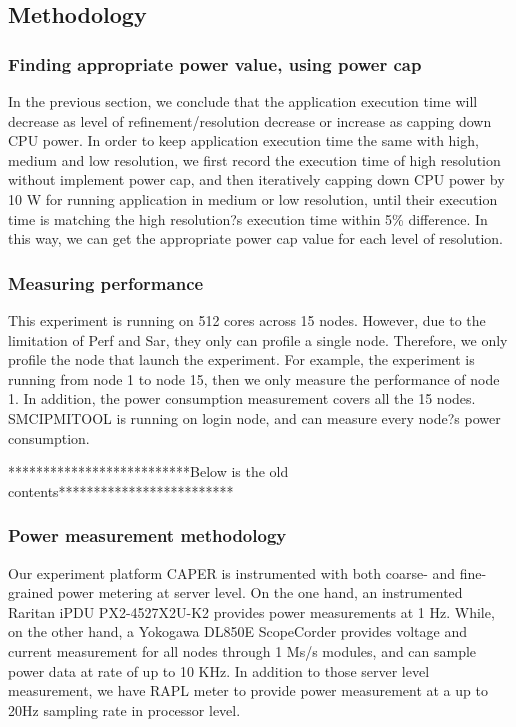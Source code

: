 \subsection{Methodology}
\subsubsection{Finding appropriate power value, using power cap}
In the previous section, we conclude that the application execution time will decrease as level of refinement/resolution decrease or increase as capping down CPU power. In order to keep application execution time the same with high, medium and low resolution, we first record the execution time of high resolution without implement power cap, and then iteratively capping down CPU power by 10 W for running application in medium or low resolution, until their execution time is matching the high resolution?s execution time within 5\% difference. In this way, we can get the appropriate power cap value for each level of resolution.

\subsubsection{Measuring performance}
This experiment is running on 512 cores across 15 nodes. However, due to the limitation of Perf and Sar, they only can profile a single node. Therefore, we only profile the node that launch the experiment. For example, the experiment is running from node 1 to node 15, then we only measure the performance of node 1. In addition, the power consumption measurement covers all the 15 nodes. SMCIPMITOOL is running on login node, and can measure every node?s power consumption.


**************************Below is the old contents*************************
\subsubsection{Power measurement methodology}
Our experiment platform CAPER is instrumented with both coarse- and fine-grained power metering at server level. On the one hand, an instrumented Raritan iPDU PX2-4527X2U-K2 provides power measurements at 1 Hz. While, on the other hand, a Yokogawa DL850E ScopeCorder provides voltage and current measurement for all nodes through 1 Ms/s modules, and can sample power data at rate of up to 10 KHz. In addition to those server level measurement, we have RAPL meter to provide power measurement at a up to 20Hz sampling rate in processor level. 


